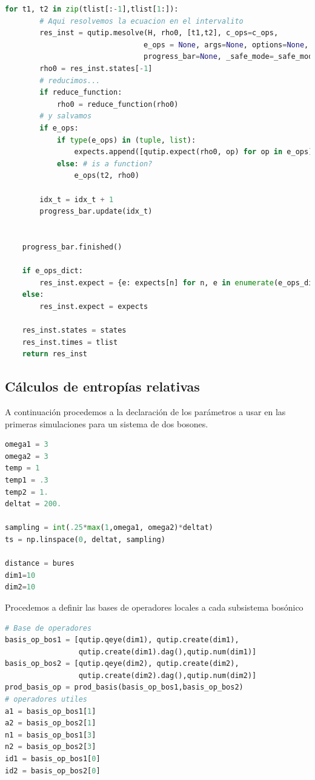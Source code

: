 \documentclass{report} %
\numberwithin{equation}{section}
\begin{document}
\begin{lstlisting}[language=Python]
    for t1, t2 in zip(tlist[:-1],tlist[1:]):
        # Aqui resolvemos la ecuacion en el intervalito
        res_inst = qutip.mesolve(H, rho0, [t1,t2], c_ops=c_ops,
                                e_ops = None, args=None, options=None,
                                progress_bar=None, _safe_mode=_safe_mode)
        rho0 = res_inst.states[-1]
        # reducimos...
        if reduce_function:
            rho0 = reduce_function(rho0)
        # y salvamos
        if e_ops:
            if type(e_ops) in (tuple, list):
                expects.append([qutip.expect(rho0, op) for op in e_ops])
            else: # is a function?
                e_ops(t2, rho0)
                
        idx_t = idx_t + 1
        progress_bar.update(idx_t)

            
    progress_bar.finished()

    if e_ops_dict:
        res_inst.expect = {e: expects[n] for n, e in enumerate(e_ops_dict.keys())}
    else:
        res_inst.expect = expects

    res_inst.states = states
    res_inst.times = tlist    
    return res_inst
\end{lstlisting}

\subsection{Cálculos de entropías relativas}

A continuación procedemos a la declaración de los parámetros a usar en las primeras simulaciones para un sistema de dos bosones. 

\begin{lstlisting}[language=Python]
omega1 = 3
omega2 = 3
temp = 1
temp1 = .3
temp2 = 1.
deltat = 200.

sampling = int(.25*max(1,omega1, omega2)*deltat)
ts = np.linspace(0, deltat, sampling)

distance = bures
dim1=10
dim2=10
\end{lstlisting}

Procedemos a definir las bases de operadores locales a cada subsistema bosónico 

\begin{lstlisting}[language=Python]
# Base de operadores
basis_op_bos1 = [qutip.qeye(dim1), qutip.create(dim1),
                 qutip.create(dim1).dag(),qutip.num(dim1)]
basis_op_bos2 = [qutip.qeye(dim2), qutip.create(dim2),
                 qutip.create(dim2).dag(),qutip.num(dim2)]
prod_basis_op = prod_basis(basis_op_bos1,basis_op_bos2)
# operadores utiles
a1 = basis_op_bos1[1]
a2 = basis_op_bos2[1]
n1 = basis_op_bos1[3]
n2 = basis_op_bos2[3]
id1 = basis_op_bos1[0]
id2 = basis_op_bos2[0]
\end{lstlisting}
\end{document}
